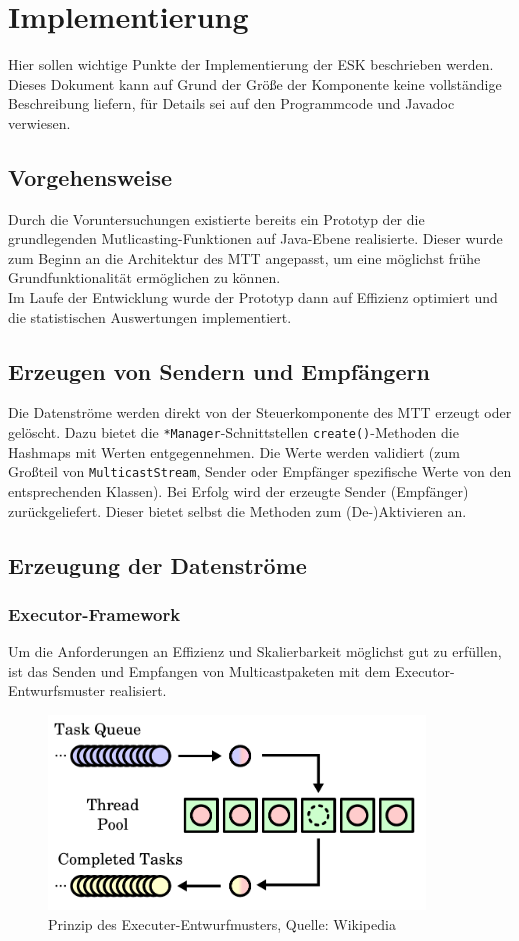 \chapter{Implementierung}
Hier sollen wichtige Punkte der Implementierung der ESK beschrieben werden.
Dieses Dokument kann auf Grund der Größe der Komponente keine vollständige
Beschreibung liefern, für Details sei auf den Programmcode und Javadoc
verwiesen.

\section{Vorgehensweise}
Durch die Voruntersuchungen existierte bereits ein Prototyp der die
grundlegenden Mutlicasting-Funktionen auf Java-Ebene realisierte. Dieser wurde zum Beginn an
die Architektur des MTT angepasst, um eine möglichst frühe
Grundfunktionalität ermöglichen zu können.\\
Im Laufe der Entwicklung wurde der Prototyp dann auf Effizienz optimiert und die
statistischen Auswertungen implementiert.

\section{Erzeugen von Sendern und Empfängern}
Die Datenströme werden direkt von der Steuerkomponente des MTT erzeugt oder
gelöscht. Dazu bietet die \texttt{*Manager}-Schnittstellen
\texttt{create()}-Methoden die Hashmaps mit Werten entgegennehmen. Die Werte
werden validiert (zum Großteil von \texttt{MulticastStream}, Sender oder
Empfänger spezifische Werte von den entsprechenden Klassen). Bei Erfolg wird der
erzeugte Sender (Empfänger) zurückgeliefert. Dieser bietet selbst die Methoden
zum (De-)Aktivieren an.

\section{Erzeugung der Datenströme}

\subsection{Executor-Framework}
Um die Anforderungen an Effizienz und Skalierbarkeit möglichst gut zu erfüllen,
ist das Senden und Empfangen von Multicastpaketen mit dem
Executor-Entwurfsmuster realisiert.

\begin{figure}[H]
\center
\includegraphics[width=10cm]{images/threadpool.pdf}
\caption{Prinzip des Executer-Entwurfmusters, Quelle: Wikipedia}
\end{figure}

